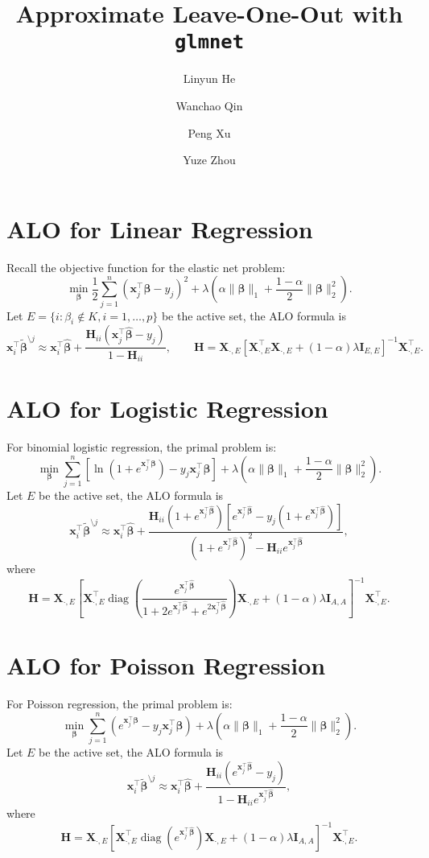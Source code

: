 \documentclass[11pt]{article}
\title{Approximate Leave-One-Out with \texttt{glmnet}}
\author{Linyun He \and Wanchao Qin \and Peng Xu \and Yuze Zhou}
\newcommand{\bx}{\bm{x}}
\newcommand{\bH}{\bm{H}}
\newcommand{\bI}{\bm{I}}
\newcommand{\bX}{\bm{X}}
\newcommand{\bbeta}{\bm{\beta}}
\DeclareMathOperator{\diag}{diag}
\begin{document}
\maketitle

\section{ALO for Linear Regression}
Recall the objective function for the elastic net problem:
	\begin{equation*}
	\min_{\bbeta}\frac{1}{2}\sum_{j=1}^{n}(\bx_j^\top\bbeta-y_j)^2+\lambda\left(\alpha\|\bbeta\|_1+\frac{1-\alpha}{2}\|\bbeta\|_2^2\right).
	\end{equation*}
Let \(E=\{i:\beta_i\not\in K,i=1,\dotsc,p\}\) be the active set, the ALO formula is \[\bx_i^\top\tilde{\bbeta}^{\setminus j}\approx\bx_i^\top\hat{\bbeta}+\frac{\bH_{ii}\left(\bx_j^\top\hat{\bbeta}-y_j\right)}{1-\bH_{ii}},\qquad\bH=\bX_{\cdot,E}\left[\bX_{\cdot,E}^\top\bX_{\cdot,E}+\left(1-\alpha\right)\lambda\bI_{E,E}\right]^{-1}\bX_{\cdot,E}^\top.\] 
\section{ALO for Logistic Regression}
For binomial logistic regression, the primal problem is: \[\min_{\bbeta}\sum_{j=1}^{n}\left[\ln\left(1+e^{\bx_j^\top\bbeta}\right)-y_j\bx_j^\top\bbeta\right]+\lambda\left(\alpha\|\bbeta\|_1+\frac{1-\alpha}{2}\|\bbeta\|_2^2\right).\] Let \(E\) be the active set, the ALO formula is \[\bx_i^\top\tilde{\bbeta}^{\setminus j}\approx\bx_i^\top\hat{\bbeta}+\frac{\bH_{ii}\left(1+e^{\bx_j^\top\hat{\bbeta}}\right)\left[e^{\bx_j^\top\hat{\bbeta}}-y_j\left(1+e^{\bx_j^\top\hat{\bbeta}}\right)\right]}{\left(1+e^{\bx_j^\top\hat{\bbeta}}\right)^2-\bH_{ii}e^{\bx_j^\top\hat{\bbeta}}},\] where \[\bH=\bX_{\cdot,E}\left[\bX_{\cdot,E}^\top\diag\left(\frac{e^{\bx_j^\top\hat{\bbeta}}}{1+2e^{\bx_j^\top\hat{\bbeta}}+e^{2\bx_j^\top\hat{\bbeta}}}\right)\bX_{\cdot,E}+(1-\alpha)\lambda\bI_{A,A}\right]^{-1}\bX_{\cdot,E}^\top.\]

\section{ALO for Poisson Regression}
For Poisson regression, the primal problem is: \[\min_{\bbeta}\sum_{j=1}^{n}\left(e^{\bx_j^\top\bbeta}-y_j\bx_j^\top\bbeta\right)+\lambda\left(\alpha\|\bbeta\|_1+\frac{1-\alpha}{2}\|\bbeta\|_2^2\right).\] Let \(E\) be the active set, the ALO formula is \[\bx_i^\top\tilde{\bbeta}^{\setminus j}\approx\bx_i^\top\hat{\bbeta}+\frac{\bH_{ii}\left(e^{\bx_j^\top\hat{\bbeta}}-y_j\right)}{1-\bH_{ii}e^{\bx_j^\top\hat{\bbeta}}},\] where \[\bH=\bX_{\cdot,E}\left[\bX_{\cdot,E}^\top\diag\left(e^{\bx_j^\top\hat{\bbeta}}\right)\bX_{\cdot,E}+(1-\alpha)\lambda\bI_{A,A}\right]^{-1}\bX_{\cdot,E}^\top.\]
\end{document}
